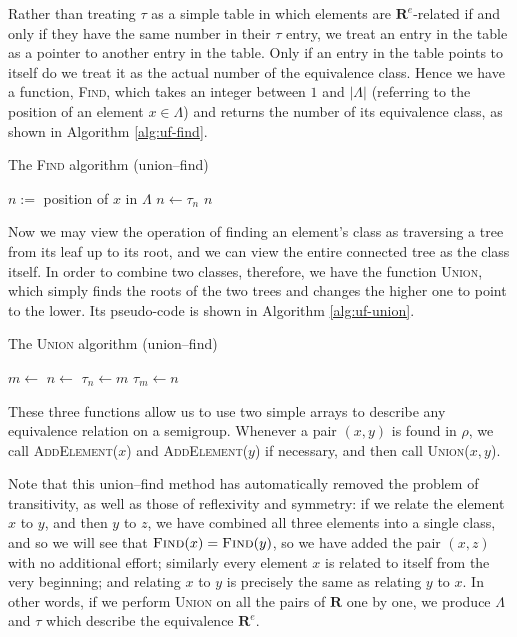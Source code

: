 Rather than treating $\tau$ as a simple table in which elements are
$\mathbf{R}^e$-related if and only if they have the same number in their $\tau$
entry, we treat an entry in the table as a pointer to another entry in the
table.  Only if an entry in the table points to itself do we treat it as the
actual number of the equivalence class.  Hence we have a function,
\textsc{Find}, which takes an integer between $1$ and $|\Lambda|$ (referring to
the position of an element $x \in \Lambda$) and returns the number of its
equivalence class, as shown in Algorithm \ref{alg:uf-find}.

\begin{algorithm}
\caption{The \textsc{Find} algorithm (union--find)}
\label{alg:uf-find}
  \begin{algorithmic}
      \State $n := $ position of $x$ in $\Lambda$
      \Repeat
        \State $n \gets \tau_n$
      \State \Return $n$
    \EndProcedure
  \end{algorithmic}
\end{algorithm}

Now we may view the operation of finding an element's class as traversing a tree
from its leaf up to its root, and we can view the entire connected tree as the
class itself.  In order to combine two classes, therefore, we have the function
\textsc{Union}, which simply finds the roots of the two trees and changes the
higher one to point to the lower.  Its pseudo-code is shown in Algorithm
\ref{alg:uf-union}.

\begin{algorithm}
\caption{The \textsc{Union} algorithm (union--find)}
\label{alg:uf-union}
  \begin{algorithmic}
      \State $m \gets $ 
      \State $n \gets $ 
        \State $\tau_n \gets m$
        \State $\tau_m \gets n$
      \EndIf
    \EndProcedure
  \end{algorithmic}
\end{algorithm}

These three functions allow us to use two simple arrays to describe any
equivalence relation on a semigroup.  Whenever a pair $(x,y)$ is found in
$\rho$, we call \textsc{AddElement($x$)} and \textsc{AddElement($y$)} if
necessary, and then call \textsc{Union($x,y$)}.

Note that this union--find method has automatically removed the problem of
transitivity, as well as those of reflexivity and symmetry: if we relate the
element $x$ to $y$, and then $y$ to $z$, we have combined all three elements
into a single class, and so we will see that
$\textsc{Find}(x) = \textsc{Find}(y)$, so we have added the pair $(x,z)$ with no
additional effort; similarly every element $x$ is related to itself from the
very beginning; and relating $x$ to $y$ is precisely the same as relating $y$ to
$x$.  In other words, if we perform \textsc{Union} on all the pairs of
$\mathbf{R}$ one by one, we produce $\Lambda$ and $\tau$ which describe the
equivalence $\mathbf{R}^e$.

